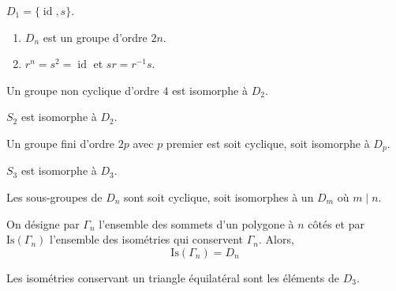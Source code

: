   \begin{example}
    $D_1 = \{ \operatorname{id}, s \}$.
  \end{example}

  \begin{proposition}
    \begin{enumerate}[label={\bfseries(\roman*)}]
      \item $D_n$ est un groupe d'ordre $2n$.
      \item $r^n = s^2 = \operatorname{id}$ et $sr = r^{-1}s$.
    \end{enumerate}
  \end{proposition}


  \begin{proposition}
    Un groupe non cyclique d'ordre $4$ est isomorphe à $D_2$.
  \end{proposition}


  \begin{example}
    $S_2$ est isomorphe à $D_2$.
  \end{example}


  \begin{proposition}
    Un groupe fini d'ordre $2p$ avec $p$ premier est soit cyclique, soit isomorphe à $D_p$.
  \end{proposition}

  \begin{example}
    $S_3$ est isomorphe à $D_3$.
  \end{example}


  \begin{proposition}
    Les sous-groupes de $D_n$ sont soit cyclique, soit isomorphes à un $D_m$ où $m \mid n$.
  \end{proposition}


  \begin{theorem}
    On désigne par $\Gamma_n$ l'ensemble des sommets d'un polygone à $n$ côtés et par $\mathrm{Is}(\Gamma_n)$ l'ensemble des isométries qui conservent $\Gamma_n$. Alors,
    \[ \mathrm{Is}(\Gamma_n) = D_n \]
  \end{theorem}

  \begin{example}
    Les isométries conservant un triangle équilatéral sont les éléments de $D_3$.
  \end{example}

